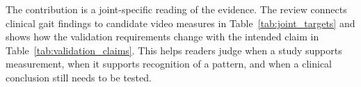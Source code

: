 \begin{revision}
The contribution is a joint-specific reading of the evidence. The review connects clinical gait findings to candidate video measures in Table~\ref{tab:joint_targets} and shows how the validation requirements change with the intended claim in Table~\ref{tab:validation_claims}. This helps readers judge when a study supports measurement, when it supports recognition of a pattern, and when a clinical conclusion still needs to be tested.
\end{revision}
\FloatBarrier
